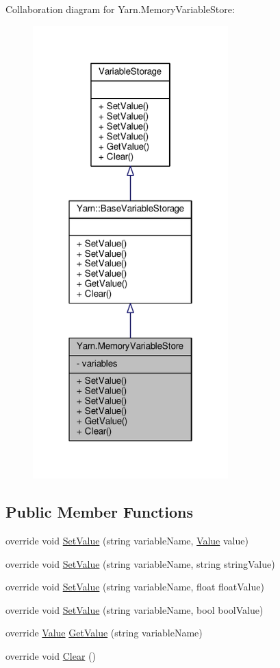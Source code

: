 Collaboration diagram for Yarn.\-Memory\-Variable\-Store\-:
\nopagebreak
\begin{figure}[H]
\begin{center}
\leavevmode
\includegraphics[width=214pt]{a00588}
\end{center}
\end{figure}
\subsection*{Public Member Functions}
\begin{DoxyCompactItemize}
\item 
override void \hyperlink{a00130_a653a459811e5c19549f4b31269093ef5}{Set\-Value} (string variable\-Name, \hyperlink{a00167}{Value} value)
\item 
override void \hyperlink{a00130_a381b389cb7c60c42f5bb2e9136c3f19d}{Set\-Value} (string variable\-Name, string string\-Value)
\item 
override void \hyperlink{a00130_a810e94d390a6de1012eb77cb51963688}{Set\-Value} (string variable\-Name, float float\-Value)
\item 
override void \hyperlink{a00130_ae7d221c8347f380fe0b79a7ba434764c}{Set\-Value} (string variable\-Name, bool bool\-Value)
\item 
override \hyperlink{a00167}{Value} \hyperlink{a00130_a0ce77e8245c504a777540e359704aa2a}{Get\-Value} (string variable\-Name)
\item 
override void \hyperlink{a00130_aa6d243e7ef02b91f793a221f509dae69}{Clear} ()
\end{DoxyCompactItemize}
